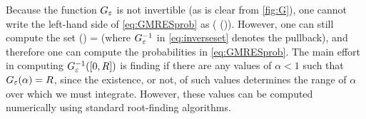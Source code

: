 \label{rem:computable}
Because the function $G_{\varepsilon}$ is not invertible (as is clear from \cref{fig:G}), one cannot write the left-hand side of \cref{eq:GMRESprob} as
\beqs
\PP\mleft(\NLiDRR{\nso-\nst} \leq \GfnnameI\mleft(\mleft[0,R\mright]\mright)\mright).
\eeqs
However, one can still compute the set
\beq\label{eq:inverseset}
\GfnnameI\mleft(\mleft[0,R\mright]\mright) = \set{\alpha \st \Gfn{\alpha} \in \mleft[0,R\mright]}
\eeq
(where $G_{\varepsilon}^{-1}$ in \cref{eq:inverseset} denotes the pullback), and therefore one can compute the probabilities in \cref{eq:GMRESprob}. The main effort in computing $\GfnI{\mleft[0,R\mright]}$ is finding if there are any values of $\alpha < 1$ such that $\Gfn{\alpha} = R$, since the existence, or not, of such values determines the range of $\alpha$ over which we must integrate. However, these values can be computed numerically using standard root-finding algorithms.
\ere
